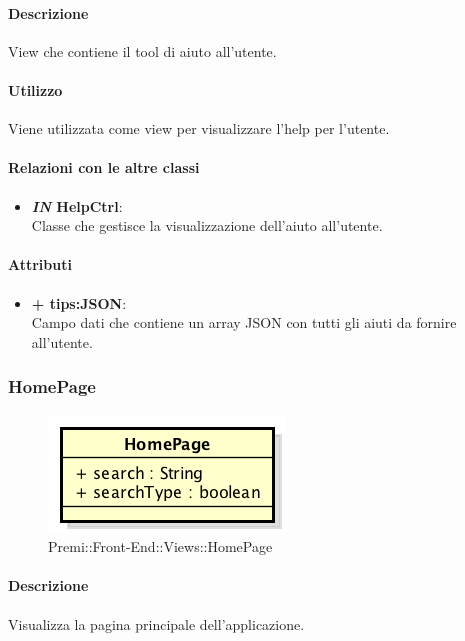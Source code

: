 	\paragraph{Descrizione}
	View che contiene il tool di aiuto all'utente.
	
	\paragraph{Utilizzo}
	Viene utilizzata come view per visualizzare l'help per l'utente.
	
	\paragraph{Relazioni con le altre classi}
	\begin{itemize}
		\item \textbf{\textit{IN} HelpCtrl}:\\
		Classe che gestisce la visualizzazione dell'aiuto all'utente.
	\end{itemize}
	
	\paragraph{Attributi}
	\begin{itemize}
		\item \textbf{+ tips:JSON}: \\
		Campo dati che contiene un array JSON con tutti gli aiuti da fornire all'utente.
	\end{itemize}
\newpage
	
	
\subsubsection{HomePage}
	\begin{figure}[h]
		\centering
		\includegraphics[width=0.3\linewidth]{img/premi_front_end_views_homepage}
		\caption[Premi::Front-End::Views::HomePage]{Premi::Front-End::Views::HomePage}
	\end{figure}
	
	\paragraph{Descrizione}
	Visualizza la pagina principale dell'applicazione.
	
